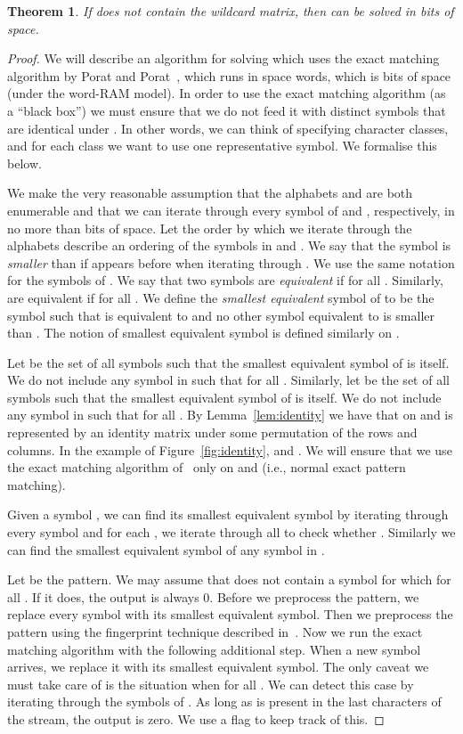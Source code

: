 \documentclass{article}
\theoremstyle{plain}
\newtheorem{theorem}{Theorem}[]
\theoremstyle{definition}
\begin{document}
\begin{theorem}
    \label{lem:and-exact}
    If  does not contain the wildcard matrix, then  can be solved in  bits of space.
\end{theorem}
\begin{proof}
    We will describe an algorithm for solving  which uses the exact matching algorithm by Porat and Porat~\cite{Porat:09}, which runs in space  words, which is  bits of space (under the word-RAM model). In order to use the exact matching algorithm (as a ``black box'') we must ensure that we do not feed it with distinct symbols that are identical under . In other words, we can think of  specifying character classes, and for each class we want to use one representative symbol. We formalise this below.

    We make the very reasonable assumption that the alphabets  and  are both enumerable and that we can iterate through every symbol of  and , respectively, in no more than  bits of space. Let the order by which we iterate through the alphabets describe an ordering of the symbols in  and . We say that the symbol  is \emph{smaller} than  if  appears before  when iterating through . We use the same notation for the symbols of . We say that two symbols  are \emph{equivalent} if  for all . Similarly,  are equivalent if  for all . We define the \emph{smallest equivalent} symbol of  to be the symbol  such that  is equivalent to  and no other symbol equivalent to  is smaller than . The notion of smallest equivalent symbol is defined similarly on .

    Let  be the set of all symbols  such that the smallest equivalent symbol of  is  itself. We do not include any symbol  in  such that  for all . Similarly, let  be the set of all symbols  such that the smallest equivalent symbol of  is  itself. We do not include any symbol  in  such that  for all . By Lemma~\ref{lem:identity} we have that  on  and  is represented by an identity matrix under some permutation of the rows and columns. In the example of Figure~\ref{fig:identity},  and . We will ensure that we use the exact matching algorithm of~\cite{Porat:09} only on  and  (i.e., normal exact pattern matching).

    Given a symbol , we can find its smallest equivalent symbol by iterating through every symbol  and for each , we iterate through all  to check whether . Similarly we can find the smallest equivalent symbol of any symbol in .

    Let  be the pattern. We may assume that  does not contain a symbol  for which  for all . If it does, the output is always 0. Before we preprocess the pattern, we replace every symbol with its smallest equivalent symbol. Then we preprocess the pattern using the fingerprint technique described in~\cite{Porat:09}. Now we run the exact matching algorithm with the following additional step. When a new symbol  arrives, we replace it with its smallest equivalent symbol. The only caveat we must take care of is the situation when  for all . We can detect this case by iterating through the symbols of . As long as  is present in the last  characters of the stream, the output is zero. We use a flag to keep track of this.
\end{proof}
\end{document}
